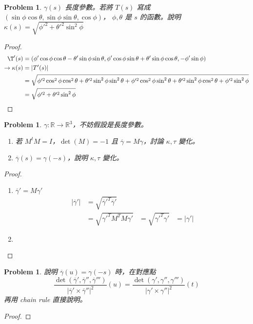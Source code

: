 \documentclass[10pt,a4paper]{article}
\newcounter{theProblemCounter}
\newtheorem{problem}[theProblemCounter]{Problem}
\begin{document}
\setcounter{theProblemCounter}{5}
\begin{problem}
$\gamma(s)$ 長度參數。若將 $T(s)$ 寫成 $(\sin\phi\cos\theta, \sin\phi\sin\theta, \cos\phi)$， $\phi,\theta$ 是 $s$ 的函數。說明 $\kappa(s)=\sqrt{\phi'^2+\theta'^2\sin^2\phi}$
\end{problem}
\begin{proof}
\begin{align*}
\T'(s)&=(\phi'\cos\phi\cos\theta-\theta'\sin\phi\sin\theta,\phi'\cos\phi\sin\theta+\theta'\sin\phi\cos\theta,-\phi'\sin\phi)\\
\rightarrow\kappa(s)&=\left|T'(s)\right|\\
&=\sqrt{\phi'^2\cos^2\phi\cos^2\theta+\theta'^2\sin^2\phi\sin^2\theta+\phi'^2\cos^2\phi\sin^2\theta+\theta'^2\sin^2\phi\cos^2\theta+\phi'^2\sin^2\phi}\\
&=\sqrt{\phi'^2+\theta'^2\sin^2\phi}
\end{align*}
\end{proof}

\setcounter{theProblemCounter}{6}
\begin{problem}
$\gamma:\mathbb{R}\to\mathbb{R}^3$，不妨假設是長度參數。
\begin{enumerate}
\item[(b)] 若 $M^tM=I$，$\det(M)=-1$ 且 $\overline{\gamma}=M\gamma$，討論 $\kappa, \tau$ 變化。
\item[(c)] $\overline{\gamma}(s)=\gamma(-s)$，說明 $\kappa, \tau$ 變化。
\end{enumerate}
\end{problem}
\begin{proof}
\begin{enumerate}
\item[(b)] $\overline{\gamma}'=M\gamma'$\\
\begin{align*}
\left|\overline{\gamma}'\right|&=\sqrt{\overline{\gamma}'^T\overline{\gamma}'}\\
&=\sqrt{\gamma'^TM^TM\gamma'}
&=\sqrt{\gamma'^T\gamma'}
&=\left|\gamma'\right|
\end{align*}
\item[(c)]
\end{enumerate}
\end{proof}

\setcounter{theProblemCounter}{7}
\begin{problem}
說明 $\overline{\gamma}(u)=\gamma(-s)$ 時，在對應點
\[
\frac{\det(\overline\gamma',\overline\gamma'',
\overline\gamma''')}{|\overline\gamma'\times \overline\gamma''|^2}(u) = 
\frac{\det(\gamma',\gamma'',\gamma''')}{|\gamma'\times\gamma''|^2}(t)
\]
再用 chain rule 直接說明。
\end{problem}
\begin{proof}
\end{proof}
\end{document}
